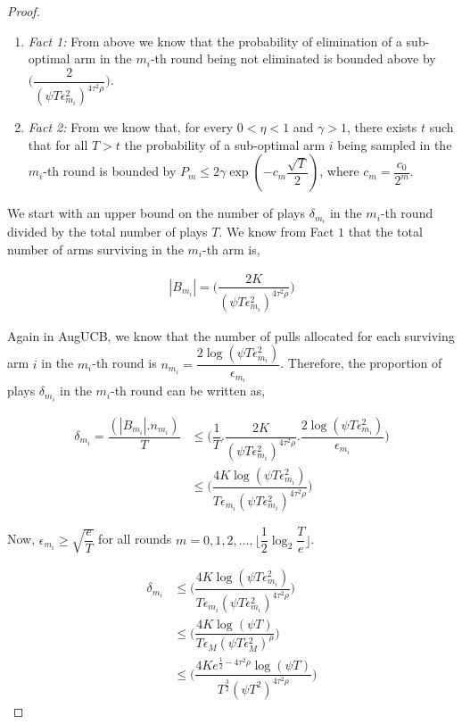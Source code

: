 \begin{proof}
\begin{enumerate}
\item \emph{Fact 1:} From above we know that the probability of elimination of a sub-optimal arm in the $m_{i}$-th round being not eliminated is bounded above by $\bigg(\dfrac{2}{(\psi T\epsilon_{m_{i}}^{2})^{4\tau^{2}\rho}}\bigg)$.
\item \emph{Fact 2:} From \cite{tolpin2012mcts} we know that, for every $0<\eta <1$ and $\gamma > 1$, there exists $t$ such that for all $T>t$ the probability of a sub-optimal arm $i$ being sampled in the $m_{i}$-th round is bounded by $P_{m}\leq 2\gamma \exp(-c_{m}\dfrac{\sqrt{T}}{2})$, where $c_{m}=\dfrac{c_{0}}{2^{m}}$.
\end{enumerate}

We start with an upper bound on the number of plays $\delta_{m_{i}}$ in the $m_{i}$-th round divided by the total number of plays $T$. We know  from Fact $1$  that the total number of arms surviving in the $m_{i}$-th arm is, 

\begin{align*}
|B_{m_{i}}|=\bigg(\dfrac{2K}{(\psi T\epsilon_{m_{i}}^{2})^{4\tau^{2}\rho}}\bigg) 
\end{align*}     

Again in AugUCB, we know that the number of pulls allocated for each surviving arm $i$ in the $m_{i}$-th round is $n_{m_{i}}=\dfrac{2\log (\psi T \epsilon_{m_{i}}^{2})}{\epsilon_{m_{i}}}$. Therefore, the proportion of plays $\delta_{m_{i}}$ in the $m_{i}$-th round can be written as,

\begin{align*}
\delta_{m_{i}}=\dfrac{(|B_{m_{i}}|.n_{m_{i}})}{T} &\leq \bigg(\dfrac{1}{T}.\dfrac{2K}{(\psi T\epsilon_{m_{i}}^{2})^{4\tau^{2}\rho}}.\dfrac{2\log (\psi T \epsilon_{m_{i}}^{2})}{\epsilon_{m_{i}}}\bigg)\\
& \leq \bigg(\dfrac{4K\log (\psi T \epsilon_{m_{i}}^{2})}{T\epsilon_{m_{i}}(\psi T\epsilon_{m_{i}}^{2})^{4\tau^{2}\rho}}\bigg)
\end{align*}

Now, $\epsilon_{m_{i}}\geq \sqrt{\dfrac{e}{T}}$ for all rounds $m=0,1,2,...,\big \lfloor \dfrac{1}{2}\log_{2} \dfrac{T}{e}\big\rfloor$.

\begin{align*}
\delta_{m_{i}} &\leq \bigg(\dfrac{4K\log (\psi T \epsilon_{m_{i}}^{2})}{T\epsilon_{m_{i}}(\psi T\epsilon_{m_{i}}^{2})^{4\tau^{2}\rho}}\bigg)\\
& \leq \bigg(\dfrac{4K\log (\psi T )}{T\epsilon_{M}(\psi T\epsilon_{M}^{2})^{\rho}}\bigg)\\
& \leq \bigg(\dfrac{4Ke^{\frac{1}{2}-4\tau^{2}\rho}\log (\psi T )}{T^{\frac{3}{2}}(\psi T^2)^{4\tau^{2}\rho}}\bigg) 
\end{align*}


\end{proof}
